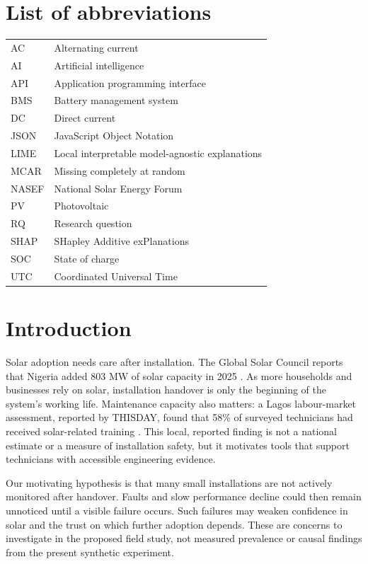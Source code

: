 \documentclass[11pt,a4paper]{article}
\begin{document}
\section*{List of abbreviations}
\begin{tabularx}{\linewidth}{@{}lY@{}}
AC & Alternating current \\
AI & Artificial intelligence \\
API & Application programming interface \\
BMS & Battery management system \\
DC & Direct current \\
JSON & JavaScript Object Notation \\
LIME & Local interpretable model-agnostic explanations \\
MCAR & Missing completely at random \\
NASEF & National Solar Energy Forum \\
PV & Photovoltaic \\
RQ & Research question \\
SHAP & SHapley Additive exPlanations \\
SOC & State of charge \\
UTC & Coordinated Universal Time \\
\end{tabularx}
\clearpage
\FloatBarrier
\section{Introduction}

Solar adoption needs care after installation. The Global Solar Council reports that Nigeria added 803 MW of solar capacity in 2025 \cite{gsc2026}. As more households and businesses rely on solar, installation handover is only the beginning of the system's working life. Maintenance capacity also matters: a Lagos labour-market assessment, reported by THISDAY, found that 58\% of surveyed technicians had received solar-related training \cite{oghifo2026}. This local, reported finding is not a national estimate or a measure of installation safety, but it motivates tools that support technicians with accessible engineering evidence.


Our motivating hypothesis is that many small installations are not actively monitored after handover. Faults and slow performance decline could then remain unnoticed until a visible failure occurs. Such failures may weaken confidence in solar and the trust on which further adoption depends. These are concerns to investigate in the proposed field study, not measured prevalence or causal findings from the present synthetic experiment.
\end{document}
